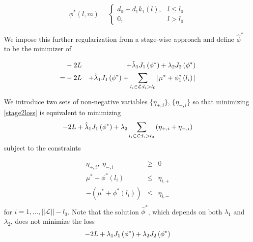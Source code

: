 \documentclass[12pt]{article}
\newcommand{\lmr}{\fontfamily{lmr}\selectfont} %
\begin{document}
\[
\phi^*\left(l,m\right) = \left\{ \begin{array}{lr} d_0 + d_1 k_1\left(l\right), & l \le l_0 \\ 0, & l > l_0 \end{array} \right.
\]



We impose this further regularization from a stage-wise approach and define $\hat{\phi}^*$ to be the minimizer of 

\begin{eqnarray}
&-2\lmr{L}& + \hat{\lambda}_1J_1\left(\phi^*\right) + \lambda_2 J_2\left(\phi^*\right)\\
= &-2\lmr{L}& + \hat{\lambda}_1J_1\left(\phi^*\right) + \sum_{\relsize{-2} l_i \in \mathcal{L}: l_i > l_0} \vert \mu^* + \phi^*_1\left(l_i\right) \vert  \label{stage2loss}
\end{eqnarray}
\noindent



We introduce two sets of non-negative variables $\big \lbrace \eta_{+,i} \big \rbrace$, $\big \lbrace \eta_{-,i} \big \rbrace$ so that minimizing \eqref{stage2loss} is equivalent to minimizing 
\begin{eqnarray}
-2\lmr{L} + \hat{\lambda}_1J_1\left(\phi^*\right) + \lambda_2 \sum_{\relsize{-2} l_i \in \mathcal{L}: l_i > l_0} \left( \eta_{+,i} + \eta_{-,i} \right)  \label{stage2loss}
\end{eqnarray}
\noindent subject to the constraints

\begin{eqnarray*}
\eta_{+,i},\; \eta_{-,i} &\ge& 0 \\
\mu^* + \phi^*\left(l_i\right) &\le& \eta_{i,+}\\
-\left(\mu^* + \phi^*\left(l_i\right)\right) &\le& \eta_{i,-}\label{eta_constraints}\\
\end{eqnarray*}
\noindent
for $i=1,\dots,\vert \vert\mathcal{L}\vert \vert-l_0$. Note that the solution $\hat{\phi}^*$, which depends on both $\lambda_1$ and $\lambda_2$, does not minimize the loss
\[
-2\lmr{L} + \lambda_1J_1\left(\phi^*\right) + \lambda_2J_2\left(\phi^*\right) 
\]
\noindent
\end{document}
